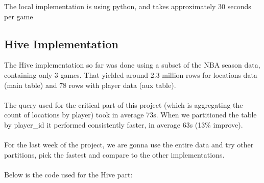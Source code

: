 \documentclass[11pt]{article}
\begin{document}
The local implementation is using python, and takes approximately 30 seconds per game





\subsection*{Hive Implementation}
The Hive implementation so far was done using a subset of the NBA season data, containing only 3 games. That yielded around 2.3 million rows for locations data (main table) and 78 rows with player data (aux table).\\
\\ The query used for the critical part of this project (which is aggregating the count of locations by player) took in average 73s. When we partitioned the table by player\_id it performed consistently faster, in average 63s (13\% improve).\\
\\ For the last week of the project, we are gonna use the entire data and try other partitions, pick the fastest and compare to the other implementations.\\
\\Below is the code used for the Hive part: \\
\end{document}
